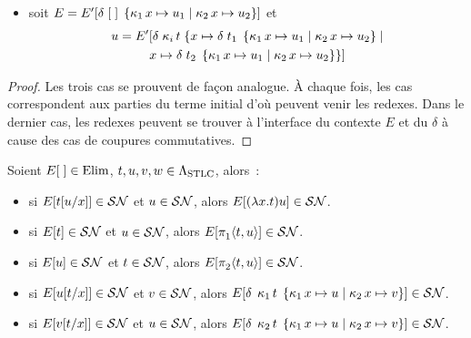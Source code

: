 \begin{theorem}
\begin{itemize}
\begin{itemize}
      $u = E'[\deltaSTLC{\coprojP{i}t}x{\projP{j}{}t_1}x{\projP{j}{}t_2}]$,
    \item soit $E = E'[\delta\;[\;]\;\left\{\mathop{\kappa_{1}} x\mapsto u_1 \;\middle\vert\; \mathop{\kappa_{2}} x\mapsto u_2\right\}]$ et
      \begin{multline*}
        u = E'[\delta\;{\mathop{\kappa_{i}}t}\;
          \{x \mapsto {\delta\;t_1\;\left\{\mathop{\kappa_{1}} x\mapsto u_1 \;\middle\vert\; \mathop{\kappa_{2}} x\mapsto u_2\right\}}\mid\\
          x\mapsto \delta\;t_2\;\left\{\mathop{\kappa_{1}} x\mapsto u_1 \;\middle\vert\; \mathop{\kappa_{2}} x\mapsto u_2\right\}\}]
      \end{multline*}
    \end{itemize}
  \end{itemize}
\end{theorem}

\begin{proof}
  Les trois cas se prouvent de façon analogue. \`A chaque fois, les cas
  correspondent aux parties du terme initial d'où peuvent venir les redexes.
  Dans le dernier cas, les redexes peuvent se trouver à l'interface du contexte
  $E$ et du $\delta$ à cause des cas de coupures commutatives.
\end{proof}

\begin{corollary}\label{cor.wh.expand}
  Soient $E[\;]\in\mathrm{Elim}$, $t,u,v,w \in \Lambda_{\mathrm{STLC}}$, alors~:
  \begin{itemize}
  \item si $E[t[u/x]] \in \mathcal{SN}$ et $u\in\mathcal{SN}$, alors $E[(\lambda x.t)u]\in\mathcal{SN}$.
  \item si $E[t]\in\mathcal{SN}$ et $u\in\mathcal{SN}$, alors
    $E[\mathop{\pi_{1}^{}}\langle t,u\rangle]\in\mathcal{SN}$.
  \item si $E[u]\in\mathcal{SN}$ et $t\in\mathcal{SN}$, alors
    $E[\mathop{\pi_{2}^{}}\langle t,u\rangle]\in\mathcal{SN}$.
  \item si $E[u[t/x]]\in \mathcal{SN}$ et $v \in \mathcal{SN}$, alors
    $E[\delta\;\mathop{\kappa_{1}}t\;\left\{\mathop{\kappa_{1}} x\mapsto u \;\middle\vert\; \mathop{\kappa_{2}} x\mapsto v\right\}]\in\mathcal{SN}$.
  \item si $E[v[t/x]]\in \mathcal{SN}$ et $u \in \mathcal{SN}$, alors
    $E[\delta\;\mathop{\kappa_{2}}t\;\left\{\mathop{\kappa_{1}} x\mapsto u \;\middle\vert\; \mathop{\kappa_{2}} x\mapsto v\right\}]\in\mathcal{SN}$.
  \end{itemize}
\end{corollary}

